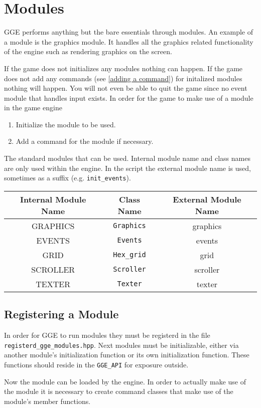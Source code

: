 \documentclass{article}
\begin{document}
\section{Modules} \label{inner modules}
GGE performs anything but the bare essentials through modules. An example of a module is the graphics module. It handles all the graphics related functionality of the engine such as rendering graphics on the screen.

If the game does not initializes any modules nothing can happen. 
If the game does not add any commands (see \ref{adding a command}) for initalized modules nothing will happen.
You will not even be able to quit the game since no event module that handles input exists.
In order for the game to make use of a module in the game engine
\begin{enumerate}
	\item Initialize the module to be used.
	\item Add a command for the module if necessary.
\end{enumerate}

The standard modules that can be used. Internal module name and class names are only used within the engine. 
In the script the external module name is used, sometimes as a suffix (e.g. \verb|init_events|).

\begin{tabular}{|c|c||c|}
	Internal Module Name & Class Name & External Module Name \\
	\hline
	GRAPHICS & \verb|Graphics| & graphics \\
	EVENTS & \verb|Events| & events \\
	GRID & \verb|Hex_grid| & grid \\
	SCROLLER & \verb|Scroller| & scroller \\
	TEXTER & \verb|Texter| & texter \\
\end{tabular}

\subsection{Registering a Module}
In order for GGE to run modules they must be registerd in the file \verb|registerd_gge_modules.hpp|.
Next modules must be initializable, either via another module's initialization function or its own initialization
function. These functions should reside in the \verb|GGE_API| for exposure outside.

Now the module can be loaded by the engine. In order to actually make use of the module it is necessary to create
command classes that make use of the module's member functions.
\end{document}
